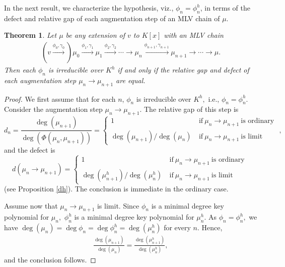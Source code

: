 \documentclass[11pt]{amsart}
\newtheorem{theorem}{Theorem}[section]
\theoremstyle{definition}
\theoremstyle{remark}
\numberwithin{equation}{section}
\begin{document}
In the next result, we characterize the hypothesis, viz., $\phi_n=\phi_n^h$, in terms of the defect and relative gap of each augmentation step of an MLV chain of $\mu.$
	\begin{theorem}\label{mt2}
		Let $\mu$ be any extension of $v$ to $K[x]$ with an MLV chain \begin{align*}
		(v\xrightarrow{\phi_0,\gamma_0})\mu_0\xrightarrow{\phi_1,\gamma_1} \mu_1\xrightarrow{\phi_2,\gamma_2}\cdots \longrightarrow \mu_{n}\xrightarrow{\phi_{n+1},\gamma_{n+1}} \mu_{n+1}\longrightarrow\cdots\longrightarrow \mu. 
	\end{align*}
	Then each $\phi_n$ is irreducible over $K^h$ if and only if the relative gap and defect of each augmentation step $\mu_n\longrightarrow \mu_{n+1}$ are equal.
	\end{theorem}
	\begin{proof}
		We first assume that for each $n$, $\phi_n$ is irreducible over $K^h,$ i.e., $\phi_n=\phi_n^h.$ Consider the augmentation step $\mu_n\longrightarrow \mu_{n+1}.$ The relative gap of this step is  \[d_{n}=\frac{\deg(\mu_{n+1})}{\deg(\Phi(\mu_n,\mu_{n+1}))}= \begin{cases} 1 & \text{if} \ \mu_{n}\longrightarrow \mu_{n+1}\ \text{is ordinary }\\ \deg(\mu_{n+1})/\deg(\mu_{n})\ &  \text{if} \ \mu_{n}\longrightarrow \mu_{n+1} \ \text{is limit }\end{cases}, \] and the defect is  \[d(\mu_n\longrightarrow \mu_{n+1})= \begin{cases} 1 & \text{if} \ \mu_{n}\longrightarrow \mu_{n+1}\ \text{is ordinary }\\ \deg(\mu_{n+1}^h)/\deg(\mu_{n}^h)\ &  \text{if} \ \mu_{n}\longrightarrow \mu_{n+1} \ \text{is limit }\end{cases} \] (see Proposition \ref{dh}). The conclusion is immediate in the ordinary case. 
		
		Assume now that $\mu_n\longrightarrow \mu_{n+1}$ is limit. Since $\phi_n$ is a minimal degree key polynomial for $\mu_n,$	$\phi_n^h$ is a minimal degree key polynomial for $\mu_n^h.$ As $\phi_n=\phi_n^h,$ we have $\deg(\mu_n)=\deg \phi_n=\deg \phi_n^h=\deg(\mu_n^h)$ for every $n.$ Hence, \begin{align}\label{ed}
		\frac{\deg(\mu_{n+1})}{\deg(\mu_n)}=\frac{\deg(\mu_{n+1}^h)}{\deg(\mu_n^h)},	
		\end{align} and the conclusion follows.
		

\end{proof}
\end{document}
